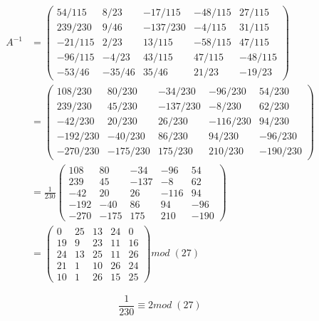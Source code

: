 \documentclass{article}
\begin{document}
\begin{enumerate}
\begin{equation*}
\begin{split}
    A^{-1}& =\left(
    \begin{array}{ccccc}
    54/115 & 8/23 & -17/115 & -48/115 & 27/115 \\
    239/230 & 9/46 & -137/230 & -4/115 & 31/115\\
     -21/115 & 2/23 &  13/115 & -58/115 & 47/115 \\
    -96/115 & -4/23 & 43/115 & 47/115 & -48/115 \\
    -53/46 & -35/46 & 35/46 & 21/23 & -19/23
    \end{array}  \right)\\
    &=\left(
    \begin{array}{ccccc}
    108/230 & 80/230 & -34/230 & -96/230 & 54/230  \\
    239/230 & 45/230 & -137/230 & -8/230 & 62/230\\
     -42/230 & 20/230 &  26/230 &  -116/230 & 94/230\\
    -192/230& -40/230 & 86/230 & 94/230 & -96/230 \\
    -270/230 & -175/230 & 175/230 & 210/230 & -190/230
    \end{array}  \right)\\
    &= \frac{1}{230}\left(
    \begin{array}{ccccc}
    108 & 80 & -34 & -96 & 54  \\
    239 & 45 & -137 & -8 & 62\\
    -42 & 20 &  26 &  -116 & 94\\
    -192 & -40 &86 & 94 & -96 \\
    -270 & -175 & 175 & 210 & -190
    \end{array}  \right)  \\
    & = \left(
    \begin{array}{ccccc}
    0 & 25 & 13 & 24 & 0 \\
    19 & 9 & 23 & 11 & 16 \\
    24 & 13 & 25 & 11 & 26 \\
    21 & 1 & 10 & 26 & 24 \\
    10 & 1 & 26 & 15 & 25
    \end{array}
    \right) mod \; (27)
   \end{split}
\end{equation*}



\begin{equation*}
    \frac{1}{230}\equiv 2 mod \; (27)
\end{equation*}


\end{enumerate}
\end{document}
